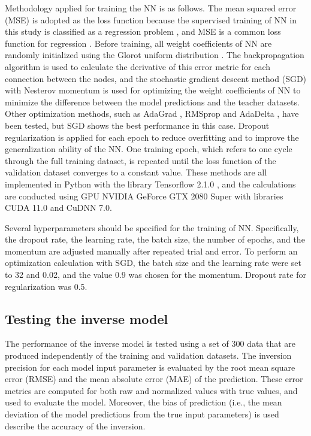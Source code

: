 Methodology applied for training the NN is as follows. The mean squared error (MSE) is adopted as the loss function because the supervised training of NN in this study is classified as a regression problem \citep{Specht1991}, and MSE is a common loss function for regression \citep{Bishop2006,Hastie2009,ShalevShwartz2014}. Before training, all weight coefficients of NN are randomly initialized using the Glorot uniform distribution \citep{Glorot2010}. The backpropagation algorithm \citep{Rumelhart1986} is used to calculate the derivative of this error metric for each connection between the nodes, and the stochastic gradient descent method (SGD) with Nesterov momentum \citep{NESTEROV1983} is used for optimizing the weight coefficients of NN to minimize the difference between the model predictions and the teacher datasets. Other optimization methods, such as AdaGrad \citep{Duchi2011}, RMSprop \citep{Tieleman2012} and AdaDelta \citep{Zeiler2012}, have been tested, but SGD shows the best performance in this case. Dropout regularization \citep{Srivastava2014} is applied for each epoch to reduce overfitting and to improve the generalization ability of the NN. One training epoch, which refers to one cycle through the full training dataset, is repeated until the loss function of the validation dataset converges to a constant value. These methods are all implemented in Python with the library Tensorflow 2.1.0 \citep{Raschka2019}, and the calculations are conducted using GPU NVIDIA GeForce GTX 2080 Super with libraries CUDA 11.0 and CuDNN 7.0.

Several hyperparameters should be specified for the training of NN. Specifically, the dropout rate, the learning rate, the batch size, the number of epochs, and the momentum are adjusted manually after repeated trial and error. To perform an optimization calculation with SGD, the batch size and the learning rate were set to 32 and 0.02, and the value 0.9 was chosen for the momentum. Dropout rate for regularization was 0.5. 

\subsection{Testing the inverse model}

The performance of the inverse model is tested using a set of 300 data that are produced independently of the training and validation datasets. The inversion precision for each model input parameter is evaluated by the root mean square error (RMSE) and the mean absolute error (MAE) of the prediction. These error metrics are computed for both raw and normalized values with true values, and used to evaluate the model. Moreover, the bias of prediction (i.e., the mean deviation of the model predictions from the true input parameters) is used describe the accuracy of the inversion. 

